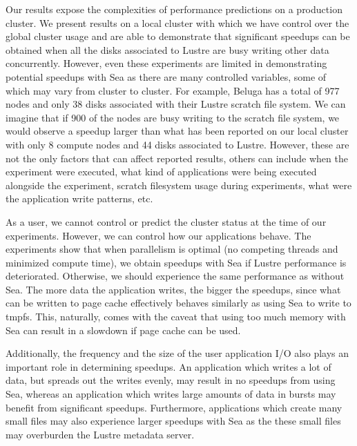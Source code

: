     Our results expose the complexities of performance predictions on a
    production cluster. We present results on a local cluster with which we have
    control over the global cluster usage and are able to demonstrate that
    significant speedups can be obtained when all the disks associated to Lustre
    are busy writing other data concurrently. However, even these experiments
    are limited in demonstrating potential speedups with Sea as there are many
    controlled variables, some of which may vary from cluster to cluster. For
    example, Beluga has a total of 977 nodes and only 38 disks associated with
    their Lustre scratch file system. We can imagine that if 900 of the nodes
    are busy writing to the scratch file system, we would observe a speedup
    larger than what has been reported on our local cluster with only 8 compute
    nodes and 44 disks associated to Lustre. However, these are not the only
    factors that can affect reported results, others can include when the
    experiment were executed, what kind of applications were being executed
    alongside the experiment, scratch filesystem usage during experiments, what
    were the application write patterns, etc.

    As a user, we cannot control or predict the cluster status at the time of
    our experiments. However, we can control how our applications behave. The
    experiments show that when parallelism is optimal (no competing threads and
    minimized compute time), we obtain speedups with Sea if Lustre performance
    is deteriorated. Otherwise, we should experience the same performance as 
    without Sea. The more data the application writes, the bigger the speedups, since what
    can be written to page cache effectively behaves similarly as using Sea to write
    to tmpfs. This, naturally, comes with the caveat that using too much memory with
    Sea can result in a slowdown if page cache can be used.
    
    Additionally, the frequency and the size of the user application I/O also
    plays an important role in determining speedups. An application which writes
    a lot of data, but spreads out the writes evenly, may result in no
    speedups from using Sea, whereas an application which writes large amounts
    of data in bursts may benefit from significant speedups. Furthermore,
    applications which create many small files may also experience larger
    speedups with Sea as the these small files may overburden the Lustre
    metadata server.

